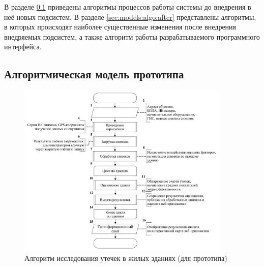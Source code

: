 \par
	В разделе \ref{sec:models:algo:before} приведены алгоритмы процессов работы системы до внедрения в неё новых подсистем. В разделе \ref{sec:models:algo:after} представлены алгоритмы, в которых происходят наиболее существенные изменения после внедрения внедряемых подсистем, а также алгоритм работы разрабатываемого программного интерфейса.

\subsection{Алгоритмическая модель прототипа}
\label{sec:models:algo:before}

	\begin{figure}[h!]
      \centering
      \includegraphics[width=0.9\textwidth]{images/am/am0_before}
      \caption{Алгоритм исследования утечек в жилых зданиях (для прототипа)}
      \label{am:before:common}
    \end{figure}

\pagebreak


